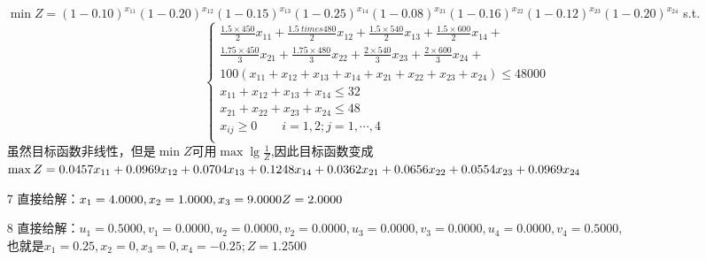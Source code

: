 \documentclass[a4paper,20pt]{article}
\begin{document}
\begin{itemize}
    
        $\min Z =(1-0.10)^{x_{11}}(1-0.20)^{x_{12}}(1-0.15)^{x_{13}}(1-0.25)^{x_{14}}
        (1-0.08)^{x_{21}}
        (1-0.16)^{x_{22}}(1-0.12)^{x_{23}}(1-0.20)^{x_{24}}$
        s.t.$$\left\{\begin{matrix}
            \frac{1.5 \times 450}{2}x_{11}+\frac{1.5 \ times 480}{2}x_{12}+\frac{1.5 \times 540}{2}x_{13}+\frac{1.5 \times 600}{2}x_{14}+\\\frac{1.75 \times 450}{3}x_{21}+\frac{1.75 \times 480}{3}x_{22}+\frac{2 \times 540}{3}x_{23}+\frac{2 \times 600}{3}x_{24}+\\100(x_{11}+x_{12}+x_{13}+x_{14}+x_{21}+x_{22}+x_{23}+x_{24})\leq 48000\\
            x_{11}+x_{12}+x_{13}+x_{14} \leq 32\\
            x_{21}+x_{22}+x_{23}+x_{24} \leq 48\\
            x_{ij}\geq 0 \qquad i=1,2;j=1,\cdots,4\\
        \end{matrix}\right.$$
虽然目标函数非线性，但是$\min Z$可用$\max \lg{\frac{1}{Z}}$,因此目标函数变成
\\$\max Z =0.0457x_{11}+0.0969x_{12}+0.0704x_{13}+0.1248x_{14}+0.0362x_{21}+\\0.0656x_{22}+0.0554x_{23}+0.0969x_{24}$
\item[7]直接给解：$x_1 =
4.0000
,x_2=1.0000
,x_3=9.0000
\\Z=2.0000$
\item[8]直接给解：$u_1=
0.5000,
v_1=0.0000,
u_2=0.0000,
v_2=0.0000,
u_3=0.0000,
v_3=0.0000,
u_4=0.0000,
v_4=0.5000,$
\\也就是$
x_1=0.25,x_2=0,x_3=0,x_4=-0.25;
Z =1.2500$


\end{itemize}
\end{document}
